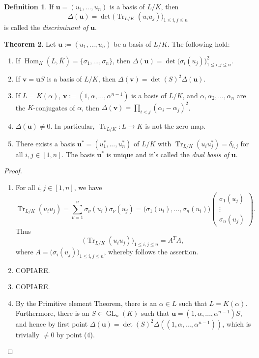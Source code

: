 \documentclass[12pt,a4paper]{report}
\theoremstyle{definition}
\newtheorem{theorem}{Theorem}[chapter] %
\newtheorem{defn}[theorem]{Definition}
\theoremstyle{num.custom-title}
\DeclareMathOperator{\Hom}{Hom}
\DeclareMathOperator{\Tr}{Tr}
\DeclareMathOperator{\GL}{GL}
\newcommand{\ol}{\overline}
\renewcommand{\u}{\mathbf{u}}
\begin{document}
\begin{defn}
If $\u = (u_1,...,u_n)$ is a basis of $L/K$, then
\[
\Delta(\u) = \det \Big( \Tr_{L/K}(u_i u_j) \Big)_{1 \leq i,j \leq n}
\]
is called the \emph{discriminant of} $\u$.
\end{defn}

\begin{theorem}\label{thm_discr-computation}
Let $\u := (u_1,...,u_n)$ be a basis of $L/K$. The following hold:
\begin{enumerate}
\item If $\Hom_K(L,\ol{K}) = \{\sigma_1,...,\sigma_n\}$, then $\Delta(\u) = \det \Big( \sigma_i(u_j) \Big)_{1 \leq i,j \leq n}^2$.
\item If $\mathbf{v}=\u S$ is a basis of $L/K$, then $\Delta(\mathbf{v}) = \det(S)^2 \Delta(\u)$.
\item If $L=K(\alpha)$, $\mathbf{v}:=(1,\alpha,...,\alpha^{n-1})$ is a basis of $L/K$, and $\alpha,\alpha_2,...,\alpha_n$ are the $K$-conjugates of $\alpha$, then $\Delta(\mathbf{v}) = \prod_{i<j}(\alpha_i - \alpha_j)^2$.
\item $\Delta(\u) \neq 0$. In particular, $\Tr_{L/K} : L \to K$ is not the zero map.
\item There exists a basis $\u^* = (u_1^*,...,u_n^*)$ of $L/K$ with $\Tr_{L/K}(u_i u_j^*) = \delta_{i,j}$ for all $i,j \in [1,n]$. The basis $\u^*$ is unique and it's called the \emph{dual basis of} $\u$.
\end{enumerate}
\begin{proof}\ 
\begin{enumerate}
\item For all $i,j \in [1,n]$, we have
\[
\Tr_{L/K}(u_i u_j) = \sum_{\nu=1}^n \sigma_\nu(u_i) \sigma_\nu(u_j) = \Big( \sigma_1(u_i), \ldots ,\sigma_n(u_i) \Big)
\begin{pmatrix}
\sigma_1(u_j) \\
\vdots \\
\sigma_n(u_j)
\end{pmatrix}.
\]
Thus
\[
\Big( \Tr_{L/K} (u_i u_j) \Big)_{1 \leq i,j \leq n} = A^T A,
\]
where $A = \Big( \sigma_i(u_j) \Big)_{1 \leq i,j \leq n}$, whereby follows the assertion.
\item COPIARE.
\item COPIARE.
\item By the Primitive element Theorem, there is an $\alpha \in L$ such that $L=K(\alpha)$. Furthermore, there is an $S \in \GL_n(K)$ such that $\u = (1,\alpha,...,\alpha^{n-1})S$, and hence by first point $\Delta(\u) = \det(S)^2 \Delta((1,\alpha,...,\alpha^{n-1}))$, which is trivially $\neq 0$ by point (4).

\end{enumerate}
\end{proof}
\end{theorem}
\end{document}
